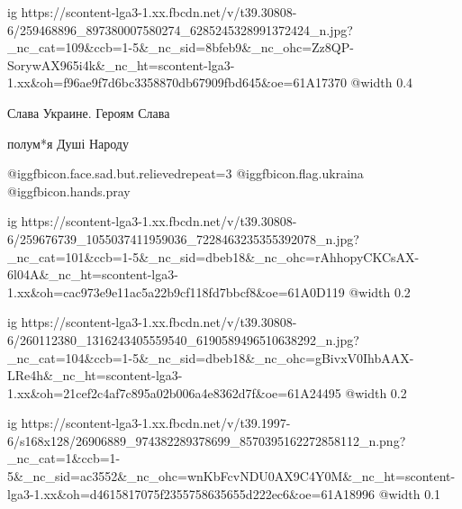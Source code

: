  
 
 
 
 

\ifcmt
  ig https://scontent-lga3-1.xx.fbcdn.net/v/t39.30808-6/259468896_897380007580274_6285245328991372424_n.jpg?_nc_cat=109&ccb=1-5&_nc_sid=8bfeb9&_nc_ohc=Zz8QP-SorywAX965i4k&_nc_ht=scontent-lga3-1.xx&oh=f96ae9f7d6bc3358870db67909fbd645&oe=61A17370
  @width 0.4
\fi

Слава Украине. Героям Слава

полум*я Душі Народу

 @igg{fbicon.face.sad.but.relieved}{repeat=3} @igg{fbicon.flag.ukraina} @igg{fbicon.hands.pray} 

\ifcmt
  ig https://scontent-lga3-1.xx.fbcdn.net/v/t39.30808-6/259676739_1055037411959036_7228463235355392078_n.jpg?_nc_cat=101&ccb=1-5&_nc_sid=dbeb18&_nc_ohc=rAhhopyCKCsAX-6l04A&_nc_ht=scontent-lga3-1.xx&oh=cac973e9e11ac5a22b9cf118fd7bbcf8&oe=61A0D119
  @width 0.2
\fi


\ifcmt
  ig https://scontent-lga3-1.xx.fbcdn.net/v/t39.30808-6/260112380_1316243405559540_6190589496510638292_n.jpg?_nc_cat=104&ccb=1-5&_nc_sid=dbeb18&_nc_ohc=gBivxV0IhbAAX-LRe4h&_nc_ht=scontent-lga3-1.xx&oh=21cef2c4af7c895a02b006a4e8362d7f&oe=61A24495
  @width 0.2
\fi


\ifcmt
  ig https://scontent-lga3-1.xx.fbcdn.net/v/t39.1997-6/s168x128/26906889_974382289378699_8570395162272858112_n.png?_nc_cat=1&ccb=1-5&_nc_sid=ac3552&_nc_ohc=wnKbFcvNDU0AX9C4Y0M&_nc_ht=scontent-lga3-1.xx&oh=d4615817075f2355758635655d222ec6&oe=61A18996
  @width 0.1
\fi
